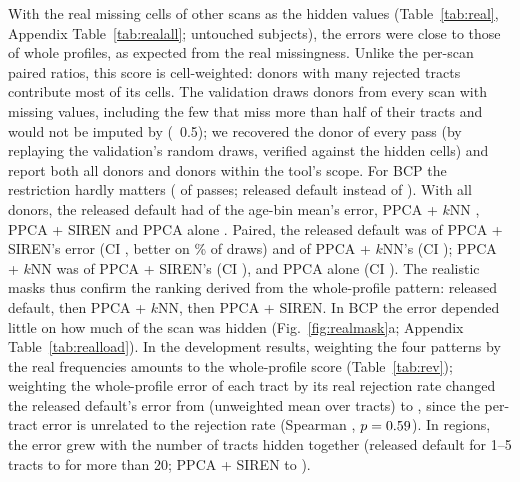 \documentclass[11pt]{article}
\begin{document}
With the real missing cells of other scans as the hidden values (Table~\ref{tab:real}, Appendix
Table~\ref{tab:realall}; untouched subjects), the errors were close to those of whole profiles, as expected from the real
missingness. Unlike the per-scan paired ratios, this score is cell-weighted: donors with many rejected tracts contribute
most of its cells. The validation draws donors from every scan with missing values, including the few that miss more
than half of their tracts and would not be imputed by  (~0.5); we
recovered the donor of every pass (by replaying the validation's random draws, verified against the hidden cells) and
report both all donors and donors within the tool's scope. For BCP the restriction hardly matters (\rmOneOutPasses{} of
\rmOnePasses{} passes; released default \rmOneFinalIn{} instead of \rmOneFinalAll). With all donors, the released default had
\eOneFinalReal{} of the age-bin mean's error, PPCA + $k$NN \eOneKnnReal, PPCA + SIREN \eOneDefReal{} and PPCA alone
\eOnePpcaReal. Paired, the released default was \eOneFinalVsDefReal{} of PPCA + SIREN's error (CI \eOneFinalVsDefRealCi,
better on \eOneFinalVsDefRealBetter\% of draws) and \eOneFinalVsKnnReal{} of PPCA + $k$NN's (CI \eOneFinalVsKnnRealCi);
PPCA + $k$NN was \eOneKnnVsDefReal{} of PPCA + SIREN's (CI \eOneKnnVsDefRealCi), and PPCA alone \eOnePpcaVsDefReal{} (CI
\eOnePpcaVsDefRealCi). The realistic masks thus confirm the ranking derived from the whole-profile pattern: released
default, then PPCA + $k$NN, then PPCA + SIREN. In BCP the error depended little on how much of the scan was hidden
(Fig.~\ref{fig:realmask}a; Appendix Table~\ref{tab:realload}). In the development results, weighting the four patterns by the real
frequencies amounts to the whole-profile score (Table~\ref{tab:rev}); weighting the whole-profile
error of each tract by its real rejection rate changed the released default's error from \trUFinal{} (unweighted mean
over tracts) to \trWFinal{}, since the per-tract error is unrelated to the rejection rate (Spearman \trRhoRej, $p =
0.59$). In regions, the error grew with the number of tracts hidden together (released default \loadFinalA{} for
1--5 tracts to \loadFinalE{} for more than 20; PPCA + SIREN \loadDefaultA{} to \loadDefaultE).

\begin{table}[t]
\centering\footnotesize
\caption{E2: error relative to the age-bin mean for the real-mask pattern (the real missing cells of a donor scan of the
same age bin and another subject), with all donors and with the donors that \texttt{impute-profiles} would impute (at most
half of their tracts missing). Cell dumps of E1 (seeds 3--5) and E3 (seeds 0--2); PPCA alone and the pooled runs are not
in the dumps (all donors: Appendix Table~\ref{tab:realall}).}\label{tab:real}
\resizebox{\textwidth}{!}{}
\end{table}
\end{document}
